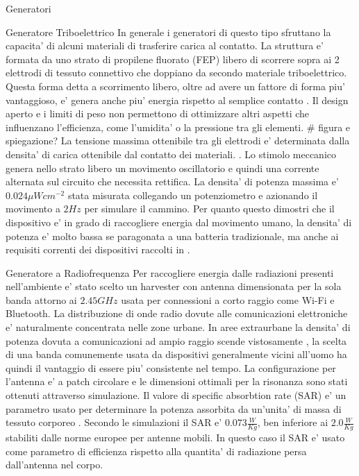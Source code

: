\begin{section}{Generatori}
    \begin{subsection}{Generatore Triboelettrico}
        In generale i generatori di questo tipo sfruttano la capacita' di alcuni materiali di trasferire carica al contatto. La struttura e' formata da uno strato di propilene fluorato (FEP) libero di scorrere sopra ai 2 elettrodi di tessuto connettivo che doppiano da secondo materiale triboelettrico. Questa forma detta a scorrimento libero, oltre ad avere un fattore di forma piu' vantaggioso, e' genera anche piu' energia rispetto al semplice contatto \cite{fuAchievingUltraDurabilityHigh2024}. Il design aperto e i limiti di peso non permettono di ottimizzare altri aspetti che influenzano l'efficienza, come l'umidita' o la pressione tra gli elementi.
        \# figura e spiegazione?
        La tensione massima ottenibile tra gli elettrodi e' determinata dalla densita' di carica ottenibile dal contatto dei materiali. . Lo stimolo meccanico genera nello strato libero un movimento oscillatorio e quindi una corrente alternata sul circuito che necessita rettifica. La densita' di potenza massima e' \(0.024\mu Wcm^{-2}\) stata misurata collegando un potenziometro e azionando il movimento a \(2Hz\) per simulare il cammino. Per quanto questo dimostri che il dispositivo e' in grado di raccogliere energia dal movimento umano, la densita' di potenza e' molto bassa se paragonata a una batteria tradizionale, ma anche ai requisiti correnti dei dispositivi raccolti in \cite{AdvancedEnergyHarvesters}.
    \end{subsection}
    
    \begin{subsection}{Generatore a Radiofrequenza}
        Per raccogliere energia dalle radiazioni presenti nell'ambiente e' stato scelto un harvester con antenna dimensionata per la sola banda attorno ai \(2.45GHz\) usata per connessioni a corto raggio come Wi-Fi e Bluetooth. La distribuzione di onde radio dovute alle comunicazioni elettroniche e' naturalmente concentrata nelle zone urbane. In aree extraurbane la densita' di potenza dovuta a comunicazioni ad ampio raggio scende vistosamente \cite{ibrahimRadioFrequencyEnergy2022}, la scelta di una banda comunemente usata da dispositivi generalmente vicini all'uomo ha quindi il vantaggio di essere piu' consistente nel tempo. La configurazione per l'antenna e' a patch circolare e le dimensioni ottimali per la risonanza sono stati ottenuti attraverso simulazione. Il valore di specific absorbtion rate (SAR) e' un parametro usato per determinare la potenza assorbita da un'unita' di massa di tessuto corporeo \cite{vallozzi26LatestDevelopments2016}. Secondo le simulazioni il SAR e' \(0.073\frac{W}{Kg}\), ben inferiore ai \(2.0\frac{W}{Kg}\) stabiliti dalle norme europee per antenne mobili. In questo caso il SAR e' usato come parametro di efficienza rispetto alla quantita' di radiazione persa dall'antenna nel corpo. 


\end{subsection}
\end{section}
